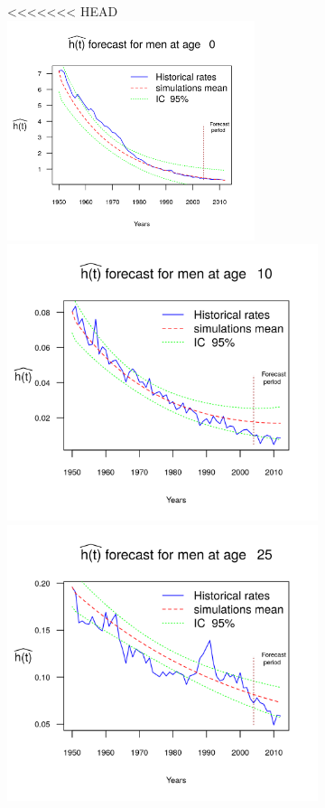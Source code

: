 \documentclass[smallextended]{svjour3}
\begin{document}
\begin{figure}[H]
\begin{figure}[H]
<<<<<<< HEAD
    \includegraphics[width = 2.85in]{PlotMenForecast0.png}
    \includegraphics{PlotMenForecast10.png}
    \includegraphics{PlotMenForecast25.png}

\end{figure}
\end{figure}
\end{document}
